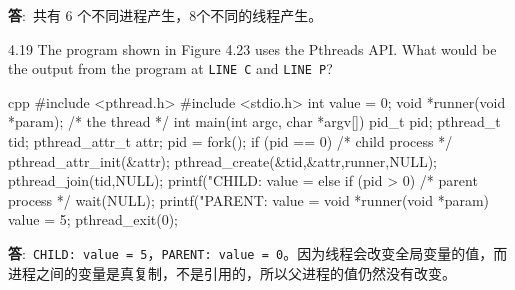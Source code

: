 \documentclass[12pt,a4paper]{article}
\newenvironment{problems}{\begin{list}{}{\renewcommand{\makelabel}[1]{\textbf{##1}\hfil}}}{\end{list}}
\providecommand{\ans}{\textbf{答}:~}
\begin{document}
\begin{problems}
    \ans 共有 6 个不同进程产生，8个不同的线程产生。

    

    \item[4.19] The program shown in Figure 4.23 uses the Pthreads API. What would
    be the output from the program at \texttt{LINE C} and \texttt{LINE P}?
    \begin{code}{cpp}
#include <pthread.h>
#include <stdio.h>
int value = 0;
void *runner(void *param); /* the thread */
int main(int argc, char *argv[])
{
    pid_t pid;
    pthread_t tid;
    pthread_attr_t attr;
    pid = fork();
    if (pid == 0) { /* child process */
        pthread_attr_init(&attr);
        pthread_create(&tid,&attr,runner,NULL);
        pthread_join(tid,NULL);
        printf("CHILD: value = %
    }
    else if (pid > 0) { /* parent process */
        wait(NULL);
        printf("PARENT: value = %
    }
}
void *runner(void *param) {
    value = 5;
    pthread_exit(0);
}
    \end{code} 

    \ans \texttt{CHILD: value = 5}，\texttt{PARENT: value = 0}。因为线程会改变全局变量的值，而进程之间的变量是真复制，不是引用的，所以父进程的值仍然没有改变。
\end{problems}
\end{document}
